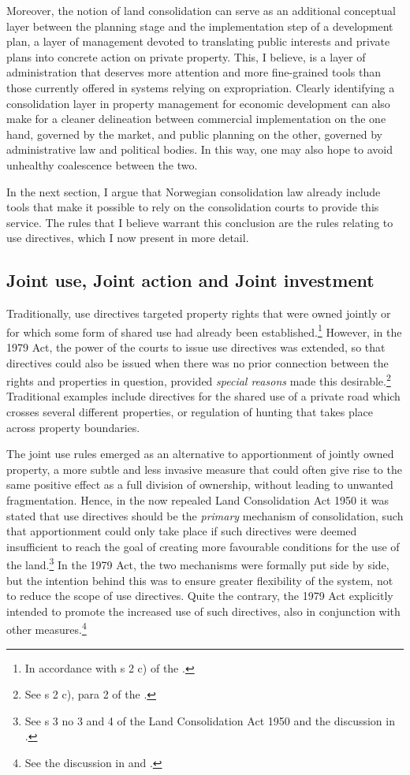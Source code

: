 Moreover, the notion of land consolidation can serve as an additional conceptual layer between the planning stage and the implementation step of a development plan, a layer of management devoted to translating public interests and private plans into concrete action on private property. This, I believe, is a layer of administration that deserves more attention and more fine-grained tools than those currently offered in systems relying on expropriation. Clearly identifying a consolidation layer in property management for economic development can also make for a cleaner delineation between commercial implementation on the one hand, governed by the market, and public planning on the other, governed by administrative law and political bodies. In this way, one may also hope to avoid unhealthy coalescence between the two.

In the next section, I argue that Norwegian consolidation law already include tools that make it possible to rely on the consolidation courts to provide this service. The rules that I believe warrant this conclusion are the rules relating to use directives, which I now present in more detail.

\subsection{Joint use, Joint action and Joint investment}\label{sec:3}

Traditionally, use directives targeted property rights that were owned jointly or for which some form of shared use had already been established.\footnote{In accordance with s 2 c) of the \cite{lca79}.} However, in the 1979 Act, the power of the courts to issue use directives was extended, so that directives could also be issued when there was no prior connection between the rights and properties in question, provided \emph{special reasons} made this desirable.\footnote{See s 2 c), para 2 of the \cite{lca79}.} Traditional examples include directives for the shared use of a private road which crosses several different properties, or regulation of hunting that takes place across property boundaries.

The joint use rules emerged as an alternative to apportionment of jointly owned property, a more subtle and less invasive measure that could often give rise to the same positive effect as a full division of ownership, without leading to unwanted fragmentation. Hence, in the now repealed Land Consolidation Act 1950 it was stated that use directives should be the \emph{primary} mechanism of consolidation, such that apportionment could only take place if such directives were deemed insufficient to reach the goal of creating more favourable conditions for the use of the land.\footnote{See s 3 no 3 and 4 of the Land Consolidation Act 1950 and the discussion in \cite[30-37]{nou76}.} In the 1979 Act, the two mechanisms were formally put side by side, but the intention behind this was to ensure greater flexibility of the system, not to reduce the scope of use directives. Quite the contrary, the 1979 Act explicitly intended to promote the increased use of such directives, also in conjunction with other measures.\footnote{See the discussion in \cite[35-37]{nou76} and \cite[47-48]{otprp56}.}

